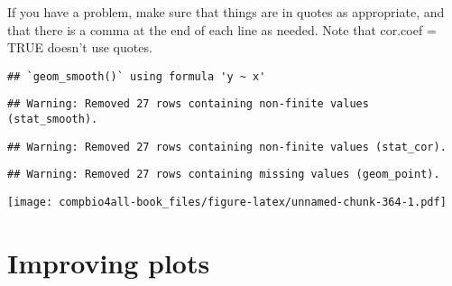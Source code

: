 \documentclass[
]{book}
\newenvironment{Shaded}{\begin{snugshade}}{\end{snugshade}}
\newcommand{\AttributeTok}[1]{\textcolor[rgb]{0.77,0.63,0.00}{#1}}
\newcommand{\ConstantTok}[1]{\textcolor[rgb]{0.00,0.00,0.00}{#1}}
\newcommand{\FunctionTok}[1]{\textcolor[rgb]{0.00,0.00,0.00}{#1}}
\newcommand{\NormalTok}[1]{#1}
\newcommand{\OtherTok}[1]{\textcolor[rgb]{0.56,0.35,0.01}{#1}}
\newcommand{\SpecialCharTok}[1]{\textcolor[rgb]{0.00,0.00,0.00}{#1}}
\newcommand{\StringTok}[1]{\textcolor[rgb]{0.31,0.60,0.02}{#1}}
\begin{document}
If you have a problem, make sure that things are in quotes as appropriate, and that there is a comma at the end of each line as needed. Note that cor.coef = TRUE doesn't use quotes.

\begin{Shaded}
\end{Shaded}

\begin{verbatim}
## `geom_smooth()` using formula 'y ~ x'
\end{verbatim}

\begin{verbatim}
## Warning: Removed 27 rows containing non-finite values (stat_smooth).
\end{verbatim}

\begin{verbatim}
## Warning: Removed 27 rows containing non-finite values (stat_cor).
\end{verbatim}

\begin{verbatim}
## Warning: Removed 27 rows containing missing values (geom_point).
\end{verbatim}

\texttt{[image: compbio4all-book\_files/figure-latex/unnamed-chunk-364-1.pdf]}

\hypertarget{improving-plots}{%
\chapter{Improving plots}\label{improving-plots}}
\end{document}
